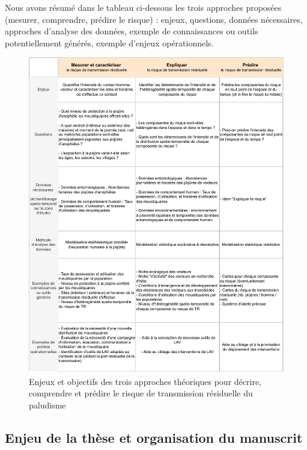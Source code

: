 \documentclass[12pt,twoside]{reedthesis}
\begin{document}
Nous avons résumé dans le tableau ci-dessous les trois approches proposées (mesurer, comprendre, prédire le risque) : enjeux, questions, données nécessaires, approches d'analyse des données, exemple de connaissances ou outils potentiellement générés, exemple d'enjeux opérationnels.\\
\begin{figure}

{\centering \includegraphics[width=1\linewidth]{tables/table_approches_tr} 

}

\caption[Enjeux et objectifs des trois approches théoriques pour décrire, comprendre et prédire le risque de transmission résiduelle du paludisme]{Enjeux et objectifs des trois approches théoriques pour décrire, comprendre et prédire le risque de transmission résiduelle du paludisme}\label{fig:table-approches-tr}
\end{figure}
\hypertarget{enjeu-de-la-thuxe8se-et-organisation-du-manuscrit}{%
\subsection{Enjeu de la thèse et organisation du manuscrit}\label{enjeu-de-la-thuxe8se-et-organisation-du-manuscrit}}
\end{document}
